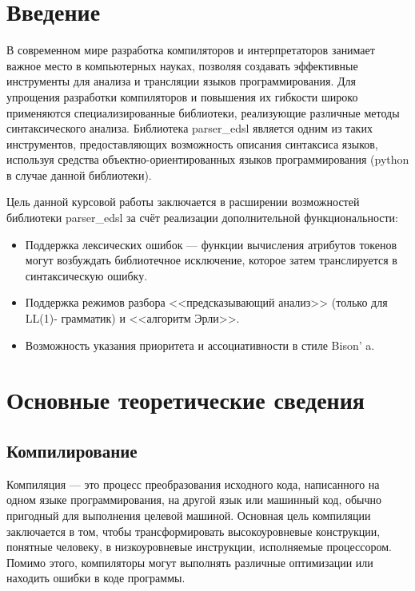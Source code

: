 \documentclass[14pt, russian]{scrartcl}
\newcommand{\anonsection}[1]{\cleardoublepage
\phantomsection
\addcontentsline{toc}{section}{\protect\numberline{}#1}
\section*{#1}\vspace*{2.5ex} %
}
\begin{document}

\setlength{\tabcolsep}{3pt}
\newpage
\setcounter{page}{2}

\newpage
\renewcommand\contentsname{\hfill{\normalfont{СОДЕРЖАНИЕ}}\hfill}  %
\tableofcontents
\newpage
\anonsection{Введение}  %

В современном мире разработка компиляторов и интерпретаторов занимает важное место в компьютерных науках, позволяя
создавать эффективные инструменты для анализа и трансляции языков программирования. Для упрощения разработки
компиляторов и повышения их
гибкости широко применяются специализированные библиотеки, реализующие различные методы синтаксического анализа.
Библиотека parser\_edsl является одним из таких инструментов, предоставляющих возможность описания синтаксиса
языков, используя средства объектно-ориентированных языков программирования (python в случае данной библиотеки).

Цель данной курсовой работы заключается в расширении возможностей библиотеки parser\_edsl
за счёт реализации дополнительной функциональности:

\begin{itemize}
	\item Поддержка лексических ошибок --- функции вычисления атрибутов токенов
	могут возбуждать библиотечное исключение, которое затем транслируется
	в синтаксическую ошибку.
	\item Поддержка режимов разбора <<предсказывающий анализ>> (только для LL(1)-
	грамматик) и <<алгоритм Эрли>>.
	\item Возможность указания приоритета и ассоциативности в стиле Bison' a.
\end{itemize}


\section{Основные теоретические сведения}

\subsection{Компилирование}

Компиляция — это процесс преобразования исходного кода, написанного на одном языке программирования,
на другой язык или машинный код,
обычно пригодный для выполнения целевой машиной. Основная цель компиляции заключается в том, чтобы
трансформировать высокоуровневые конструкции, понятные человеку, в низкоуровневые инструкции, исполняемые
процессором. Помимо этого, компиляторы могут выполнять различные оптимизации или находить ошибки в коде программы.
\end{document}
